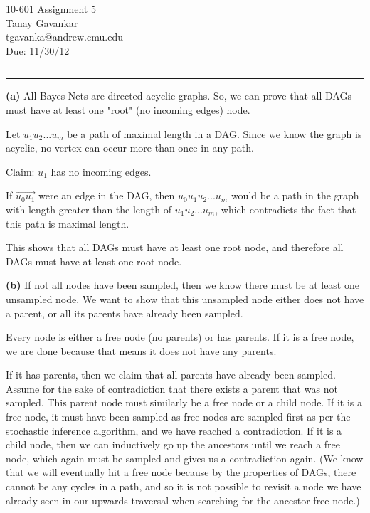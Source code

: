 \documentclass[11pt]{article}
\makeatletter
\newcommand{\question}[2] {\vspace{.25in} \hrule\vspace{0.5em}
\noindent{\bf #1: #2} \vspace{0.5em}
\hrule \vspace{.10in}}
\renewcommand{\part}[1] {\vspace{.10in} {\bf (#1)}}
\newcommand{\myname}{Tanay Gavankar}
\newcommand{\myandrew}{tgavanka@andrew.cmu.edu}
\newcommand{\myhwnum}{5}
\makeatother
\begin{document}
\medskip                            %




\thispagestyle{plain}
\begin{center}                      %
{\Large 10-601 Assignment \myhwnum} \\
\myname \\
\myandrew \\
Due: 11/30/12 \\
\end{center}




\question{1}{Bayes Net}
\part{a}
All Bayes Nets are directed acyclic graphs. So, we can prove that all DAGs must have at least one "root" (no incoming edges) node.

Let $u_1u_2...u_m$ be a path of maximal length in a DAG. Since we know the graph is acyclic, no vertex can occur more than once in any path.

Claim: $u_1$ has no incoming edges.

If $\overrightarrow{u_0u_1}$ were an edge in the DAG, then $u_0u_1u_2...u_m$ would be a path in the graph with length greater than the length of $u_1u_2...u_m$, which contradicts the fact that this path is maximal length. 

This shows that all DAGs must have at least one root node, and therefore all DAGs must have at least one root node.

\part{b}
If not all nodes have been sampled, then we know there must be at least one unsampled node. We want to show that this unsampled node either does not have a parent, or all its parents have already been sampled.

Every node is either a free node (no parents) or has parents. If it is a free node, we are done because that means it does not have any parents. 

If it has parents, then we claim that all parents have already been sampled. Assume for the sake of contradiction that there exists a parent that was not sampled. This parent node must similarly be a free node or a child node. If it is a free node, it must have been sampled as free nodes are sampled first as per the stochastic inference algorithm, and we have reached a contradiction. If it is a child node, then we can inductively go up the ancestors until we reach a free node, which again must be sampled and gives us a contradiction again. (We know that we will eventually hit a free node because by the properties of DAGs, there cannot be any cycles in a path, and so it is not possible to revisit a node we have already seen in our upwards traversal when searching for the ancestor free node.)
\end{document}
